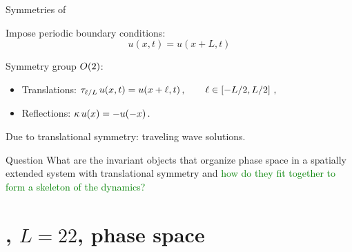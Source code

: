 \documentclass{beamer}
\begin{document}
\begin{frame}{Symmetries of \KSe}

Impose periodic boundary conditions:
\[
 u(x,t) = u(x+L,t)
\]

Symmetry group $O(2)$:
\begin{itemize}
 \item Translations: $\tau_{\ell/L}\, u(x,t) = u(x+\ell,t)\,,\qquad \ell\in\left[-L/2,L/2\right]\,,$
 \item Reflections:  $\kappa \, u(x) = -u(-x)\,.$
\end{itemize}

Due to translational symmetry: traveling wave solutions.

\begin{block}{Question} 
What are the invariant objects that organize phase space in a spatially extended system 
with translational symmetry and \textcolor{green}{how do they fit together to form a
skeleton of the dynamics?}
\end{block}


\end{frame}




\section[\KSe]{\KS, $L=22$, phase space }
\end{document}
